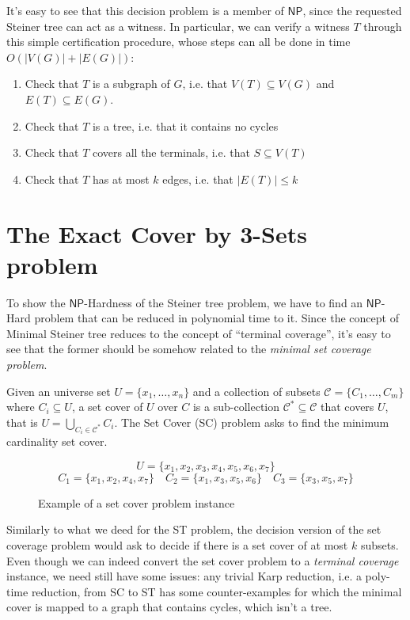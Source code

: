 \documentclass[12pt,a4paper]{article}
\newcommand{\curlyquotes}[1]{\textquotedblleft #1\textquotedblright}
\newcommand{\abs}[1]{\left|#1\right|}
\begin{document}
    It's easy to see that this decision problem is a member of $\mathsf{NP}$, since the requested Steiner tree can act as a witness. In particular, we can verify a witness $T$ through this simple certification procedure, whose steps can all be done in time $O(\abs{V(G)} + \abs{E(G)})$:
    \begin{enumerate}
        \item Check that $T$ is a subgraph of $G$, i.e. that $V(T) \subseteq V(G)$ and $E(T) \subseteq E(G)$.
        \item Check that $T$ is a tree, i.e. that it contains no cycles
        \item Check that $T$ covers all the terminals, i.e. that $S \subseteq V(T)$
        \item Check that $T$ has at most $k$ edges, i.e. that $\abs{E(T)} \leq k$
    \end{enumerate}

    \section{The Exact Cover by 3-Sets problem}

    To show the $\mathsf{NP}$-Hardness of the Steiner tree problem, we have to find an $\mathsf{NP}$-Hard problem that can be reduced in polynomial time to it. Since the concept of Minimal Steiner tree reduces to the concept of \curlyquotes{terminal coverage}, it's easy to see that the former should be somehow related to the \textit{minimal set coverage problem}.

    Given an universe set $U = \{x_1, \ldots, x_n\}$ and a collection of subsets $\mathcal{C} = \{C_1, \ldots, C_m\}$ where $C_i \subseteq U$, a set cover of $U$ over $C$ is a sub-collection $\mathcal{C}^* \subseteq \mathcal{C}$ that covers $U$, that is $U = \bigcup_{C_i \in \mathcal{C}^*} C_i$. The Set Cover (SC) problem asks to find the minimum cardinality set cover.

    \begin{figure}[H]
        \[U = \{x_1, x_2, x_3, x_4, x_5, x_6, x_7\}\]
        \[C_1 = \{x_1, x_2, x_4, x_7\} \quad C_2 = \{x_1, x_3, x_5, x_6\} \quad C_3 = \{x_3, x_5, x_7\}\]

        \caption{Example of a set cover problem instance}
    \end{figure}
    
    Similarly to what we deed for the ST problem, the decision version of the set coverage problem would ask to decide if there is a set cover of at most $k$ subsets. Even though we can indeed convert the set cover problem to a \textit{terminal coverage} instance, we need still have some issues: any trivial Karp reduction, i.e. a poly-time reduction, from SC to ST has some counter-examples for which the minimal cover is mapped to a graph that contains cycles, which isn't a tree. 
    
\end{document}
